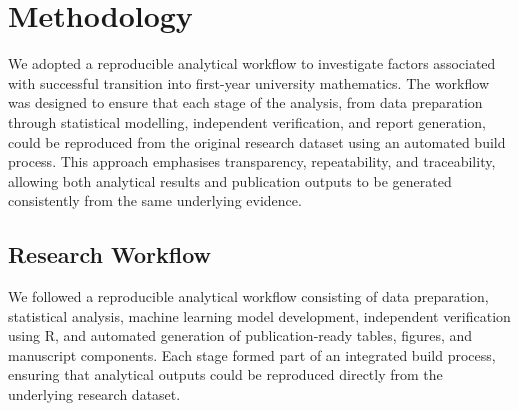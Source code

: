%
%
%
%


\section{Methodology} 
\label{sec:methodology}

We adopted a reproducible analytical workflow to investigate factors associated with successful transition into first-year university mathematics. 
The workflow was designed to ensure that each stage of the analysis, from data preparation through statistical modelling, independent verification, 
and report generation, could be reproduced from the original research dataset using an automated build process. This approach emphasises transparency, 
repeatability, and traceability, allowing both analytical results and publication outputs to be generated consistently from the same underlying evidence.

%
%
\subsection{Research Workflow}
\label{sec:workflow}

We followed a reproducible analytical workflow consisting of data preparation, statistical analysis, machine learning model development, independent 
verification using R, and automated generation of publication-ready tables, figures, and manuscript components. Each stage formed part of an integrated build 
process, ensuring that analytical outputs could be reproduced directly from the underlying research dataset.

